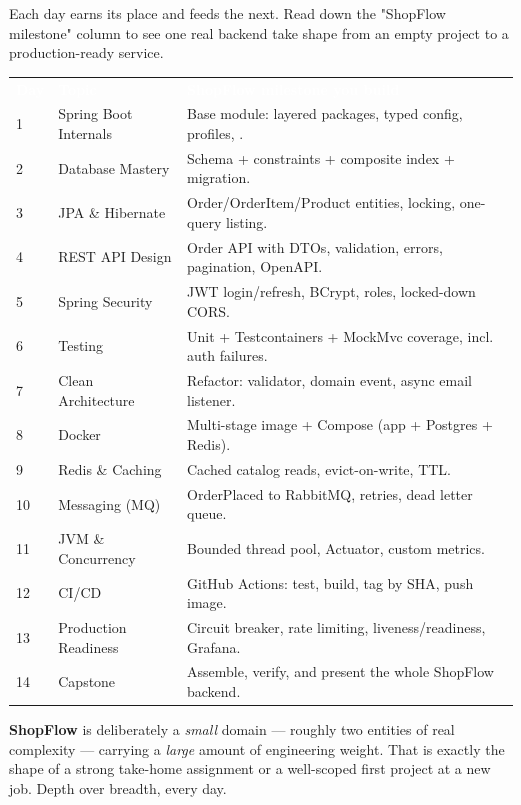 
Each day earns its place and feeds the next. Read down the "ShopFlow milestone" column to see one real
backend take shape from an empty project to a production-ready service.

\begin{center}\footnotesize
\wbrowcolors
\begin{tabularx}{\linewidth}{@{}C{7mm}L{34mm}X@{}}
\textcolor{white}{\textbf{Day}} & \textcolor{white}{\textbf{Topic}} & \textcolor{white}{\textbf{ShopFlow milestone you build}}\\
1 & Spring Boot Internals & Base module: layered packages, typed config, profiles, .\\
2 & Database Mastery & Schema + constraints + composite index + migration.\\
3 & JPA \& Hibernate & Order/OrderItem/Product entities, locking, one-query listing.\\
4 & REST API Design & Order API with DTOs, validation, errors, pagination, OpenAPI.\\
5 & Spring Security & JWT login/refresh, BCrypt, roles, locked-down CORS.\\
6 & Testing & Unit + Testcontainers + MockMvc coverage, incl. auth failures.\\
7 & Clean Architecture & Refactor: validator, domain event, async email listener.\\
8 & Docker & Multi-stage image + Compose (app + Postgres + Redis).\\
9 & Redis \& Caching & Cached catalog reads, evict-on-write, TTL.\\
10 & Messaging (MQ) & OrderPlaced to RabbitMQ, retries, dead letter queue.\\
11 & JVM \& Concurrency & Bounded thread pool, Actuator, custom metrics.\\
12 & CI/CD & GitHub Actions: test, build, tag by SHA, push image.\\
13 & Production Readiness & Circuit breaker, rate limiting, liveness/readiness, Grafana.\\
14 & Capstone & Assemble, verify, and present the whole ShopFlow backend.\\
\end{tabularx}
\end{center}

\begin{keyidea}
\textbf{ShopFlow} is deliberately a \emph{small} domain — roughly two entities of real complexity — carrying
a \emph{large} amount of engineering weight. That is exactly the shape of a strong take-home assignment or a
well-scoped first project at a new job. Depth over breadth, every day.
\end{keyidea}

